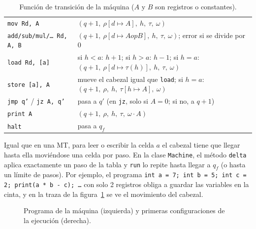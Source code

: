 \documentclass[11pt,a4paper]{article}
\newenvironment{grilla}{\footnotesize\renewcommand{\arraystretch}{1.45}\setlength{\tabcolsep}{5pt}}{}
\theoremstyle{definition}
\newcommand{\tm}[1]{\texttt{#1}}
\begin{document}
\begin{table}[H]
\centering
\begin{grilla}
\begin{tabular}{|L{4.2cm}|L{9.7cm}|}
\hline
{} &  \\ \hline
\tm{mov Rd, A} & $(q{+}1,\ \rho[d \mapsto A],\ h,\ \tau,\ \omega)$ \\ \hline
\tm{add/sub/mul/\dots{} Rd, A, B} & $(q{+}1,\ \rho[d \mapsto A \mathbin{op} B],\ h,\ \tau,\ \omega)$; error si se divide por 0 \\ \hline
\tm{load Rd, [a]} & si $h < a$: $h{+}1$; si $h > a$: $h{-}1$; si $h = a$: $(q{+}1,\ \rho[d \mapsto \tau(h)],\ h,\ \tau,\ \omega)$ \\ \hline
\tm{store [a], A} & mueve el cabezal igual que \tm{load}; si $h = a$: $(q{+}1,\ \rho,\ h,\ \tau[h \mapsto A],\ \omega)$ \\ \hline
\tm{jmp q'} / \tm{jz A, q'} & pasa a $q'$ (en \tm{jz}, solo si $A = 0$; si no, a $q{+}1$) \\ \hline
\tm{print A} & $(q{+}1,\ \rho,\ h,\ \tau,\ \omega \cdot A)$ \\ \hline
\tm{halt} & pasa a $q_f$ \\ \hline
\end{tabular}
\end{grilla}
\caption{Función de transición de la máquina ($A$ y $B$ son registros o constantes).}
\label{tab:delta-vm}
\end{table}

Igual que en una MT, para leer o escribir la celda $a$ el cabezal tiene que
llegar hasta ella moviéndose una celda por paso. En la clase \tm{Machine},
el método \tm{delta} aplica exactamente un paso de la tabla y \tm{run} lo
repite hasta llegar a $q_f$ (o hasta un límite de pasos). Por ejemplo, el
programa \tm{int a = 7; int b = 5; int c = 2; print(a * b - c); \dots} con
solo 2 registros obliga a guardar las variables en la cinta, y en la traza
de la figura~\ref{fig:traza-vm} se ve el movimiento del cabezal.

\begin{figure}[H]
\centering
\begin{minipage}[t]{0.33\textwidth}
\end{minipage}\hfill
\begin{minipage}[t]{0.63\textwidth}
\end{minipage}
\caption{Programa de la máquina (izquierda) y primeras configuraciones de la ejecución (derecha).}
\label{fig:traza-vm}
\end{figure}
\end{document}
